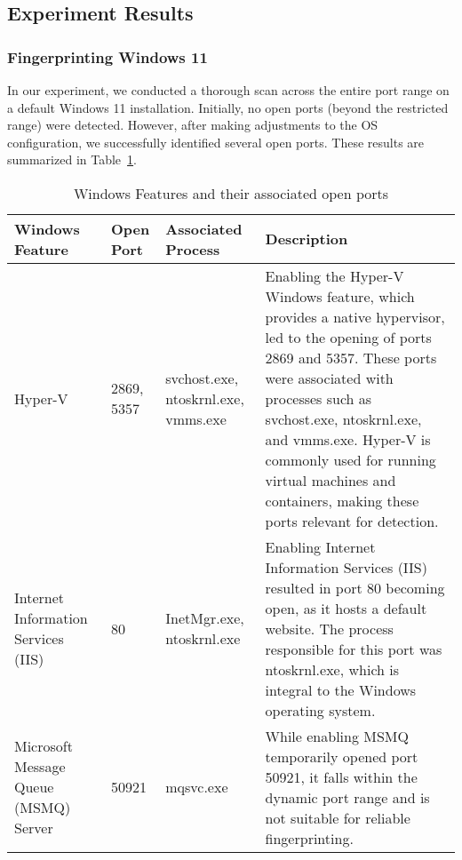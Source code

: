 \clearpage

\subsection{Experiment Results}

\subsubsection{Fingerprinting Windows 11}
\label{section:win11-fingerprint}

In our experiment, we conducted a thorough scan across the entire port range on a default Windows 11 installation. Initially, no open ports (beyond the restricted range) were detected. However, after making adjustments to the OS configuration, we successfully identified several open ports. These results are summarized in Table~\ref{tab:windows-features-open-ports}.

\begin{table}[htbp]
\footnotesize
\centering
\begin{tabular}{p{4cm}p{1cm}p{2cm}p{8cm}}
    \toprule
    Windows Feature & Open Port & Associated Process & Description \\
     \midrule
     Hyper-V & 2869, 5357 & svchost.exe, ntoskrnl.exe, vmms.exe & Enabling the Hyper-V Windows feature, which provides a native hypervisor, led to the opening of ports 2869 and 5357. These ports were associated with processes such as svchost.exe, ntoskrnl.exe, and vmms.exe. Hyper-V is commonly used for running virtual machines and containers, making these ports relevant for detection. \\
     
     Internet Information Services (IIS) & 80 & InetMgr.exe, ntoskrnl.exe & Enabling Internet Information Services (IIS) resulted in port 80 becoming open, as it hosts a default website. The process responsible for this port was ntoskrnl.exe, which is integral to the Windows operating system. \\
     
     Microsoft Message Queue (MSMQ) Server & 50921 & mqsvc.exe & While enabling MSMQ temporarily opened port 50921, it falls within the dynamic port range and is not suitable for reliable fingerprinting. \\
     \bottomrule
\end{tabular}
\caption{Windows Features and their associated open ports}
\label{tab:windows-features-open-ports}
\end{table}

